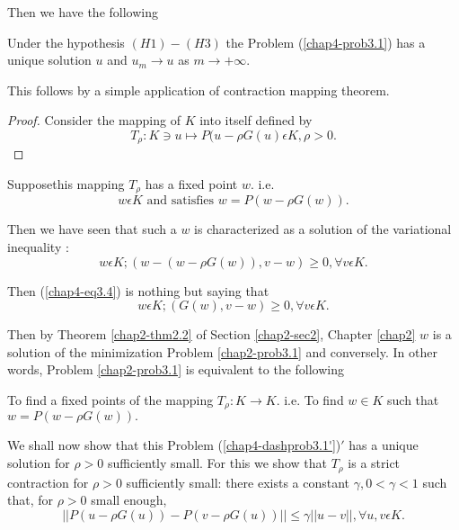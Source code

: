 Then we have the following
\begin{theorem}\label{chap4-thm3.1}
Under the hypothesis $(H1) - (H3)$ the Problem (\ref{chap4-prob3.1}) has a unique solution $u$ and $u_{m} \to u$ as $m \to + \infty$.

This follows by a simple application of contraction mapping theorem.
\end{theorem}

\begin{proof}
Consider the mapping of $K$ into itself defined by
\begin{equation*}
T_{\rho} : K \ni u \mapsto P(u - \rho G(u) \epsilon K, \rho > 0.\tag{3.3}\label{chap4-eq3.3}
\end{equation*}
\end{proof}

Suppose\pageoriginale this mapping $T_{\rho}$ has a fixed point $w$. i.e. 
$$
w \epsilon K \text{ and satisfies } w = P(w - \rho G(w)).
$$

Then we have seen that such a $w$ is characterized as a solution of the variational inequality :
\begin{equation*}
w \epsilon K ; (w-(w - \rho G(w)), v-w) \geq 0, \forall v \epsilon K.\tag{3.4}\label{chap4-eq3.4}
\end{equation*}

Then (\ref{chap4-eq3.4}) is nothing but saying that
\begin{equation*}
w \epsilon K ; (G(w), v-w) \geq 0, \forall v \epsilon K.\tag*{$(3.4)'$}\label{chap4-eq3.4'}
\end{equation*}

Then by Theorem \ref{chap2-thm2.2} of Section \ref{chap2-sec2}, Chapter \ref{chap2} $w$ is a solution of the minimization Problem \ref{chap2-prob3.1} and conversely. In other words, Problem \ref{chap2-prob3.1} is equivalent to the following

\begin{dashprob}\label{chap4-dashprob3.1'}%
To find a fixed points of the mapping $T_{\rho} : K \to K$. i.e. To find $w \in K$ such that $w = P(w-\rho G (w)).$

We shall now show that this Problem (\ref{chap4-dashprob3.1'})$'$ has a unique solution for $\rho > 0$ sufficiently small. For this we show that $T_{\rho}$ is a strict contraction for $\rho > 0$ sufficiently small: there exists a constant $\gamma, 0 < \gamma < 1$ such that, for $\rho > 0$ small enough,
$$
|| P(u - \rho G(u)) - P(v - \rho G(u)) || \leq \gamma ||u-v||, \forall u, v \epsilon K.
$$
\end{dashprob}

